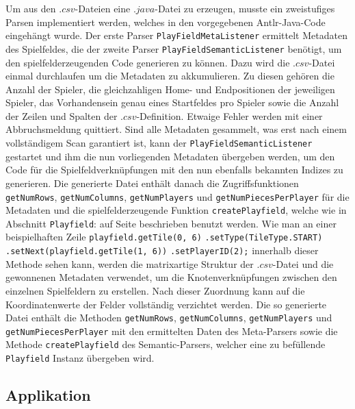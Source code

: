 \documentclass[conference]{IEEEtran}
\begin{document}
Um aus den $.csv$-Dateien eine $.java$-Datei zu erzeugen, musste ein zweistufiges Parsen implementiert werden, welches in
den vorgegebenen Antlr-Java-Code eingeh\"angt wurde. Der erste Parser \texttt{PlayFieldMetaListener} ermittelt Metadaten des Spielfeldes, die der zweite Parser \texttt{PlayFieldSemanticListener} ben\"otigt, um den spielfelderzeugenden Code generieren zu k\"onnen. Dazu wird die $.csv$-Datei einmal durchlaufen um die Metadaten zu akkumulieren. Zu diesen geh\"oren die Anzahl der Spieler, die gleichzahligen Home- und Endpositionen der jeweiligen Spieler, das Vorhandensein genau eines Startfeldes pro Spieler sowie die Anzahl der Zeilen und Spalten der $.csv$-Definition. Etwaige Fehler werden mit einer Abbruchsmeldung quittiert. Sind alle Metadaten gesammelt, was erst nach einem vollst\"andigem Scan garantiert ist, kann der \texttt{PlayFieldSemanticListener} gestartet und ihm die nun vorliegenden Metadaten \"ubergeben werden, um den Code f\"ur die Spielfeldverkn\"upfungen mit den nun ebenfalls bekannten Indizes zu generieren.
Die generierte Datei enth\"alt danach die Zugriffsfunktionen 
\texttt{getNumRows},
\texttt{getNumColumns},
\texttt{getNumPlayers} und
\texttt{getNumPiecesPerPlayer}
f\"ur die Metadaten und die spielfelderzeugende Funktion \texttt{createPlayfield}, welche wie in Abschnitt \texttt{Playfield}: auf Seite \pageref{sec:model_playfield} beschrieben benutzt werden. Wie man an einer beispielhaften Zeile\newline
\texttt{playfield.getTile(0, 6)}\newline
\texttt{.setType(TileType.START)}\newline
\texttt{.setNext(playfield.getTile(1, 6))}\newline
\texttt{.setPlayerID(2);}\newline
 innerhalb dieser Methode sehen kann, werden die matrixartige Struktur der $.csv$-Datei und die gewonnenen Metadaten verwendet, um die Knotenverkn\"upfungen zwischen den einzelnen Spielfeldern zu erstellen. Nach dieser Zuordnung kann auf die Koordinatenwerte der Felder vollst\"andig verzichtet werden. Die so generierte Datei enth\"alt die Methoden \texttt{getNumRows}, \texttt{getNumColumns}, \texttt{getNumPlayers} und \texttt{getNumPiecesPerPlayer} mit den ermittelten Daten des Meta-Parsers
sowie die Methode \texttt{createPlayfield} des Semantic-Parsers, welcher eine zu bef\"ullende \texttt{Playfield} Instanz \"ubergeben wird.


\subsection{Applikation}
\end{document}
